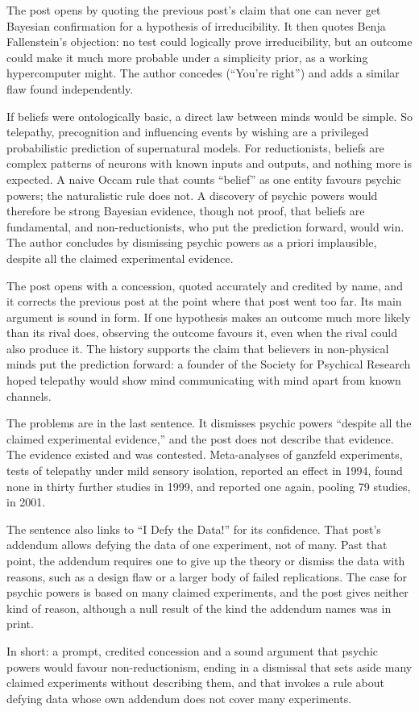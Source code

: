 \begin{afterword}
\summaryhead

The post opens by quoting the previous post's claim that one can never get Bayesian confirmation for a hypothesis of irreducibility. It then quotes Benja Fallenstein's objection: no test could logically prove irreducibility, but an outcome could make it much more probable under a simplicity prior, as a working hypercomputer might. The author concedes (``You're right'') and adds a similar flaw found independently.

If beliefs were ontologically basic, a direct law between minds would be simple. So telepathy, precognition and influencing events by wishing are a privileged probabilistic prediction of supernatural models. For reductionists, beliefs are complex patterns of neurons with known inputs and outputs, and nothing more is expected. A naive Occam rule that counts ``belief'' as one entity favours psychic powers; the naturalistic rule does not. A discovery of psychic powers would therefore be strong Bayesian evidence, though not proof, that beliefs are fundamental, and non-reductionists, who put the prediction forward, would win. The author concludes by dismissing psychic powers as a priori implausible, despite all the claimed experimental evidence.

\responsehead

The post opens with a concession, quoted accurately and credited by name, and it corrects the previous post at the point where that post went too far. Its main argument is sound in form. If one hypothesis makes an outcome much more likely than its rival does, observing the outcome favours it, even when the rival could also produce it. The history supports the claim that believers in non-physical minds put the prediction forward: a founder of the Society for Psychical Research hoped telepathy would show mind communicating with mind apart from known channels.

The problems are in the last sentence. It dismisses psychic powers ``despite all the claimed experimental evidence,'' and the post does not describe that evidence. The evidence existed and was contested. Meta-analyses of ganzfeld experiments, tests of telepathy under mild sensory isolation, reported an effect in 1994, found none in thirty further studies in 1999, and reported one again, pooling 79 studies, in 2001.

The sentence also links to ``I Defy the Data!'' for its confidence. That post's addendum allows defying the data of one experiment, not of many. Past that point, the addendum requires one to give up the theory or dismiss the data with reasons, such as a design flaw or a larger body of failed replications. The case for psychic powers is based on many claimed experiments, and the post gives neither kind of reason, although a null result of the kind the addendum names was in print.

In short: a prompt, credited concession and a sound argument that psychic powers would favour non-reductionism, ending in a dismissal that sets aside many claimed experiments without describing them, and that invokes a rule about defying data whose own addendum does not cover many experiments.
\end{afterword}
